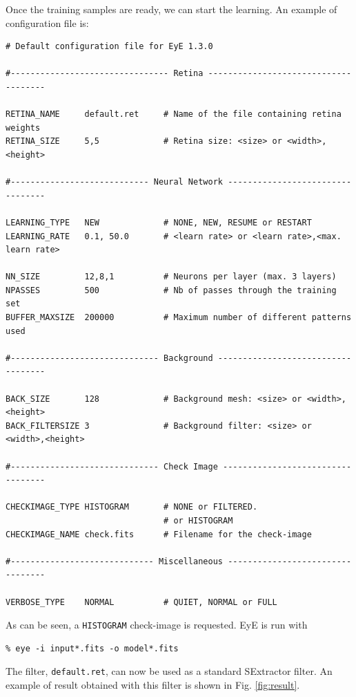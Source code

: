 \documentclass[11pt,titlepage]{article}
\begin{document}
Once the training samples are ready, we can start the learning. An example of configuration file is:
\begin{verbatim}
# Default configuration file for EyE 1.3.0

#-------------------------------- Retina -------------------------------------

RETINA_NAME     default.ret     # Name of the file containing retina weights
RETINA_SIZE     5,5             # Retina size: <size> or <width>,<height>

#---------------------------- Neural Network ---------------------------------

LEARNING_TYPE   NEW             # NONE, NEW, RESUME or RESTART
LEARNING_RATE   0.1, 50.0       # <learn rate> or <learn rate>,<max. learn rate>

NN_SIZE         12,8,1          # Neurons per layer (max. 3 layers)
NPASSES         500             # Nb of passes through the training set
BUFFER_MAXSIZE  200000          # Maximum number of different patterns used

#------------------------------ Background -----------------------------------

BACK_SIZE       128             # Background mesh: <size> or <width>,<height>
BACK_FILTERSIZE 3               # Background filter: <size> or <width>,<height>

#------------------------------ Check Image ----------------------------------

CHECKIMAGE_TYPE HISTOGRAM       # NONE or FILTERED.
                                # or HISTOGRAM
CHECKIMAGE_NAME check.fits      # Filename for the check-image

#----------------------------- Miscellaneous ---------------------------------

VERBOSE_TYPE    NORMAL          # QUIET, NORMAL or FULL
\end{verbatim}

As can be seen, a {\tt HISTOGRAM} check-image is requested. {\sc EyE} is run
with
\begin{verbatim}
% eye -i input*.fits -o model*.fits
\end{verbatim}

The filter, {\tt default.ret}, can now be used as a standard SExtractor filter.
An example of result obtained with this filter is shown in Fig. \ref{fig:result}.
\end{document}
